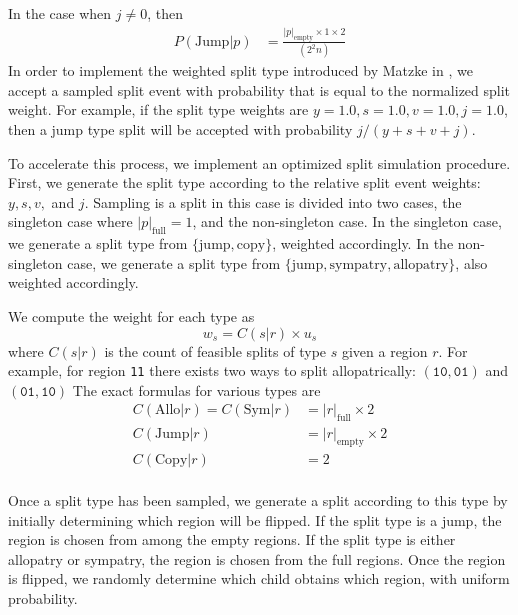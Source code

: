 \documentclass[a4paper]{article}
\newcommand{\CountFull}[1]{|#1|_\text{full}}
\newcommand{\CountEmpty}[1]{|#1|_\text{empty}}
\begin{document}
In the case when $j \neq 0$, then
\begin{align}
  P(\text{Jump} | p) &= \frac{\CountEmpty{p} \times 1 \times 2}{(2^2n)}
\end{align}
In order to implement the weighted split type introduced by Matzke in \cite{ModelSelectionMatzke2014}, we accept a
sampled split event with probability that is equal to the normalized split weight.
For example, if the split type weights are $y = 1.0, s = 1.0, v = 1.0, j=1.0$, then a jump type split will be accepted
with probability $j/(y + s + v + j)$.

To accelerate this process, we implement an optimized split simulation procedure.
First, we generate the split type according to the relative split event weights: $y, s, v,$ and $j$.
Sampling is a split in this case is divided into two cases, the singleton case where $\CountFull{p} = 1$, and the
non-singleton case.
In the singleton case, we generate a split type from $\{\text{jump}, \text{copy}\}$, weighted accordingly.
In the non-singleton case, we generate a split type from $\{\text{jump}, \text{sympatry}, \text{allopatry}\}$, also
weighted accordingly.

We compute the weight for each type as
\begin{equation}
	w_s = C(s|r) \times u_s
\end{equation}
where $C(s|r)$ is the count of feasible splits of type $s$ given a region $r$.
For example, for region \texttt{11} there exists two ways to split allopatrically: $(\texttt{10}, \texttt{01})$ and
$(\texttt{01}, \texttt{10})$
The exact formulas for various types are
\begin{align*}
  C(\text{Allo}|r) = C(\text{Sym}|r)  & = \CountFull{r} \times 2 \\ 
  C(\text{Jump}|r) & = \CountEmpty{r} \times 2 \\
  C(\text{Copy}|r) & = 2 \\
\end{align*}

Once a split type has been sampled, we generate a split according to this type by initially determining which region
will be flipped\footnotemark.
If the split type is a jump, the region is chosen from among the empty regions.
If the split type is either allopatry or sympatry, the region is chosen from the full regions.
Once the region is flipped, we randomly determine which child obtains which region, with uniform probability.

\end{document}
